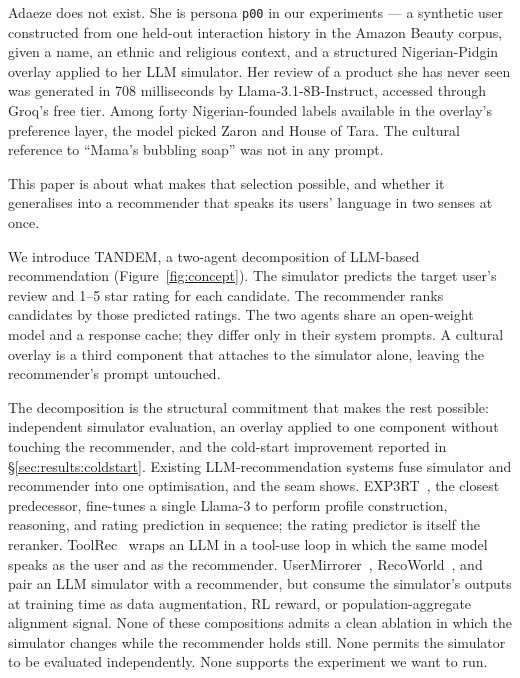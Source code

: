 \documentclass[8pt,twocolumn,a4paper]{extarticle}
\begin{document}
Adaeze does not exist. She is persona \texttt{p00} in our experiments --- a synthetic user constructed from one held-out interaction history in the Amazon Beauty corpus, given a name, an ethnic and religious context, and a structured Nigerian-Pidgin overlay applied to her LLM simulator. Her review of a product she has never seen was generated in 708 milliseconds by Llama-3.1-8B-Instruct, accessed through Groq's free tier. Among forty Nigerian-founded labels available in the overlay's preference layer, the model picked Zaron and House of Tara. The cultural reference to ``Mama's bubbling soap'' was not in any prompt.

This paper is about what makes that selection possible, and whether it generalises into a recommender that speaks its users' language in two senses at once.

We introduce TANDEM, a two-agent decomposition of LLM-based recommendation (Figure~\ref{fig:concept}). The simulator predicts the target user's review and 1--5 star rating for each candidate. The recommender ranks candidates by those predicted ratings. The two agents share an open-weight model and a response cache; they differ only in their system prompts. A cultural overlay is a third component that attaches to the simulator alone, leaving the recommender's prompt untouched.

The decomposition is the structural commitment that makes the rest possible: independent simulator evaluation, an overlay applied to one component without touching the recommender, and the cold-start improvement reported in \S\ref{sec:results:coldstart}. Existing LLM-recommendation systems fuse simulator and recommender into one optimisation, and the seam shows. EXP3RT~\citep{kim2025exp3rt}, the closest predecessor, fine-tunes a single Llama-3 to perform profile construction, reasoning, and rating prediction in sequence; the rating predictor is itself the reranker. ToolRec~\citep{zhao2024toolrec} wraps an LLM in a tool-use loop in which the same model speaks as the user and as the recommender. UserMirrorer~\citep{wei2026usermirrorer}, RecoWorld~\citep{liu2025recoworld}, and~\citet{wang2025feedback} pair an LLM simulator with a recommender, but consume the simulator's outputs at training time as data augmentation, RL reward, or population-aggregate alignment signal. None of these compositions admits a clean ablation in which the simulator changes while the recommender holds still. None permits the simulator to be evaluated independently. None supports the experiment we want to run.
\end{document}
